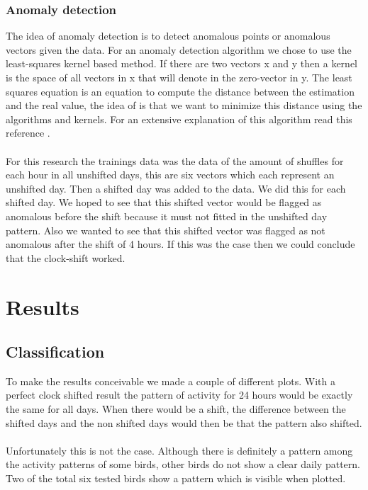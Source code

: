 \documentclass[a4paper]{article}
\begin{document}
\subsubsection*{Anomaly detection}
The idea of anomaly detection is to detect anomalous points or anomalous vectors given the data. For an anomaly detection algorithm we chose to use the least-squares kernel based method.  If there are two vectors x and y then a kernel is the space of all vectors in x that will denote in the zero-vector in y. The least squares equation is an equation to compute the distance between the estimation and the real value, the idea of is that we want to minimize this distance using the algorithms and kernels. For an extensive explanation of this algorithm read this reference \cite{engel2004kernel}.\\\\
For this research the trainings data was the data of the amount of shuffles for each hour in all unshifted days, this are six vectors which each represent an unshifted day. Then a shifted day was added to the data. We did this for each shifted day. We hoped to see that this shifted vector would be flagged as anomalous before the shift because it must not fitted in the unshifted day pattern. Also we wanted to see that this shifted vector was flagged as not anomalous after the shift of 4 hours. If this was the case then we could conclude that the clock-shift worked.
\section*{Results}

\subsection*{Classification}
To make the results conceivable we made a couple of different plots. With a perfect clock shifted result the pattern of activity for 24 hours would be exactly the same for all days. When there would be a shift, the difference between the shifted days and the non shifted days would then be that the pattern also shifted. \\ \\
Unfortunately this is not the case. Although there is definitely a pattern among the activity patterns of some birds, other birds do not show a clear daily pattern. Two of the total six tested birds show a pattern which is visible when plotted.
\end{document}
